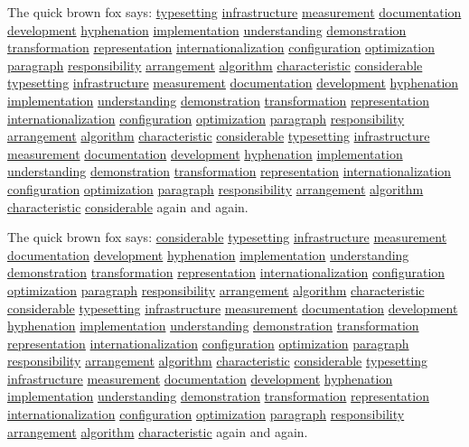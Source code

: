 \documentclass{article}
\begin{document}
The quick brown fox says: \underline{typesetting} \underline{infrastructure} \underline{measurement} \underline{documentation} \underline{development} \underline{hyphenation} \underline{implementation} \underline{understanding} \underline{demonstration} \underline{transformation} \underline{representation} \underline{internationalization} \underline{configuration} \underline{optimization} \underline{paragraph} \underline{responsibility} \underline{arrangement} \underline{algorithm} \underline{characteristic} \underline{considerable} \underline{typesetting} \underline{infrastructure} \underline{measurement} \underline{documentation} \underline{development} \underline{hyphenation} \underline{implementation} \underline{understanding} \underline{demonstration} \underline{transformation} \underline{representation} \underline{internationalization} \underline{configuration} \underline{optimization} \underline{paragraph} \underline{responsibility} \underline{arrangement} \underline{algorithm} \underline{characteristic} \underline{considerable} \underline{typesetting} \underline{infrastructure} \underline{measurement} \underline{documentation} \underline{development} \underline{hyphenation} \underline{implementation} \underline{understanding} \underline{demonstration} \underline{transformation} \underline{representation} \underline{internationalization} \underline{configuration} \underline{optimization} \underline{paragraph} \underline{responsibility} \underline{arrangement} \underline{algorithm} \underline{characteristic} \underline{considerable} again and again.

The quick brown fox says: \underline{considerable} \underline{typesetting} \underline{infrastructure} \underline{measurement} \underline{documentation} \underline{development} \underline{hyphenation} \underline{implementation} \underline{understanding} \underline{demonstration} \underline{transformation} \underline{representation} \underline{internationalization} \underline{configuration} \underline{optimization} \underline{paragraph} \underline{responsibility} \underline{arrangement} \underline{algorithm} \underline{characteristic} \underline{considerable} \underline{typesetting} \underline{infrastructure} \underline{measurement} \underline{documentation} \underline{development} \underline{hyphenation} \underline{implementation} \underline{understanding} \underline{demonstration} \underline{transformation} \underline{representation} \underline{internationalization} \underline{configuration} \underline{optimization} \underline{paragraph} \underline{responsibility} \underline{arrangement} \underline{algorithm} \underline{characteristic} \underline{considerable} \underline{typesetting} \underline{infrastructure} \underline{measurement} \underline{documentation} \underline{development} \underline{hyphenation} \underline{implementation} \underline{understanding} \underline{demonstration} \underline{transformation} \underline{representation} \underline{internationalization} \underline{configuration} \underline{optimization} \underline{paragraph} \underline{responsibility} \underline{arrangement} \underline{algorithm} \underline{characteristic} again and again.
\end{document}
